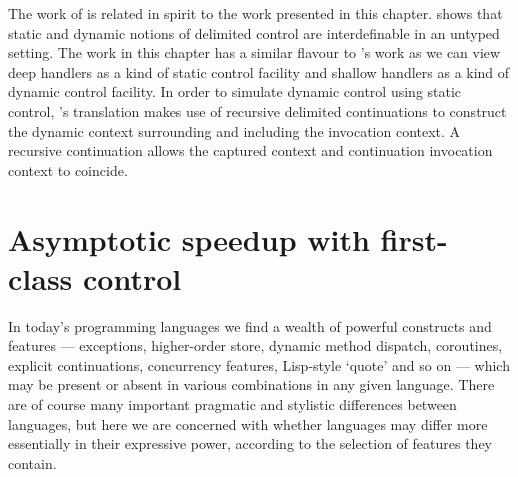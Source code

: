 \documentclass[12pt,phd,lfcs,twoside,openright,logo,leftchapter,normalheadings]{infthesis}
\theoremstyle{plain}
\theoremstyle{definition}
\begin{document}
The work of \citet{Shan04,Shan07} is related in spirit to the work
presented in this chapter. \citeauthor{Shan04} shows that static and
dynamic notions of delimited control are interdefinable in an untyped
setting. The work in this chapter has a similar flavour to
\citeauthor{Shan04}'s work as we can view deep handlers as a kind of
static control facility and shallow handlers as a kind of dynamic
control facility. In order to simulate dynamic control using static
control, \citeauthor{Shan04}'s translation makes use of recursive
delimited continuations to construct the dynamic context surrounding
and including the invocation context. A recursive continuation allows
the captured context and continuation invocation context to coincide.


\chapter{Asymptotic speedup with first-class control}
\label{ch:handlers-efficiency}
\def\LLL{{\mathcal L}}
\def\N{{\mathbb N}}
%
In today's programming languages we find a wealth of powerful
constructs and features --- exceptions, higher-order store, dynamic
method dispatch, coroutines, explicit continuations, concurrency
features, Lisp-style `quote' and so on --- which may be present or
absent in various combinations in any given language.  There are of
course many important pragmatic and stylistic differences between
languages, but here we are concerned with whether languages may differ
more essentially in their expressive power, according to the selection
of features they contain.
\end{document}
